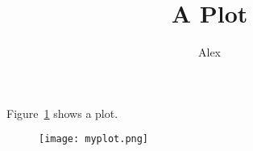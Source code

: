 \documentclass{article}
\title{A Plot}
\author{Alex}
\begin{document}
Figure~\ref{fig:plot} shows a plot.

\begin{figure}
\centering
\texttt{[image: myplot.png]}
\label{fig:plot}
\end{figure}
\end{document}
